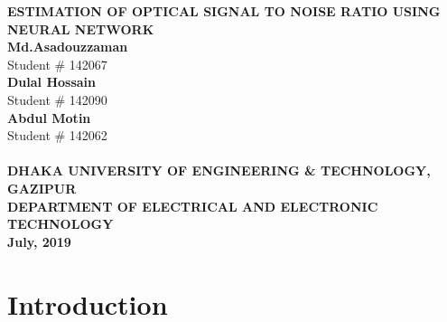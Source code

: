 \documentclass[12pt]{report}
\begin{document}
	\begin{titlepage}
		\begin{center}
			\LARGE {\bfseries {ESTIMATION OF OPTICAL SIGNAL TO NOISE RATIO USING NEURAL NETWORK}}\\[1.5cm]
			\normalsize 
			\textbf{Md.Asadouzzaman}\\
			Student \# 142067\\
			\textbf{Dulal Hossain}\\
			Student \# 142090\\
			\textbf{Abdul Motin}\\
			Student \# 142062\\[2cm]
			\\[3cm]
			\Large \bfseries {DHAKA UNIVERSITY OF ENGINEERING \& TECHNOLOGY, GAZIPUR}\\
			\large \bfseries {DEPARTMENT OF ELECTRICAL AND ELECTRONIC TECHNOLOGY}\\
			\textbf{July, 2019}
		\end{center}
	\end{titlepage}

\tableofcontents
\listoffigures




\chapter{Introduction}
\end{document}
